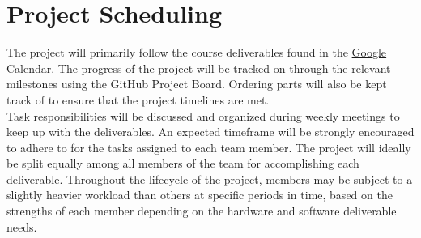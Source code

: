 \documentclass{article}
\begin{document}
	\section{Project Scheduling}
	The project will primarily follow the course deliverables found in the 
	\href{https://calendar.google.com/calendar/embed?src=rnboqiaki1k2la7rpu3bn0um58%40group.calendar.google.com&ctz=America%2FToronto}{Google Calendar}. 
	The progress of the project will be tracked on through the relevant milestones using the GitHub Project Board. 
	Ordering parts will also be kept track of to ensure that the project timelines are met.\\

\noindent Task responsibilities will be discussed and organized during weekly meetings to keep up with the deliverables. 
An expected timeframe will be strongly encouraged to adhere to for the tasks assigned to each team member. The project 
will ideally be split equally among all members of the team for accomplishing each deliverable. Throughout the lifecycle 
of the project, members may be subject to a slightly heavier workload than others at specific periods in time, based on 
the strengths of each member depending on the hardware and software deliverable needs. 
\end{document}
